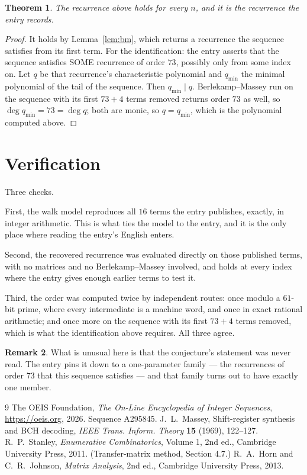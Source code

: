 \documentclass[11pt,a4paper]{article}
\theoremstyle{plain}
\newtheorem{theorem}{Theorem}
\theoremstyle{definition}
\newtheorem{remark}[theorem]{Remark}
\begin{document}
\begin{theorem}
The recurrence above holds for every $n$, and it is the recurrence the entry records.
\end{theorem}

\begin{proof}
It holds by Lemma~\ref{lem:bm}, which returns a recurrence the sequence satisfies from its
first term. For the identification: the entry asserts that the sequence satisfies SOME
recurrence of order $73$, possibly only from some index on. Let $q$ be that recurrence's
characteristic polynomial and $q_{\min}$ the minimal polynomial of the tail of the sequence.
Then $q_{\min}\mid q$. Berlekamp--Massey run on the sequence with its first $73+4$ terms
removed returns order $73$ as well, so $\deg q_{\min}=73=\deg q$; both are monic, so
$q=q_{\min}$, which is the polynomial computed above.
\end{proof}

\section{Verification}

Three checks.

First, the walk model reproduces all $16$ terms the entry publishes, exactly, in integer
arithmetic. This is what ties the model to the entry, and it is the only place where reading
the entry's English enters.

Second, the recovered recurrence was evaluated directly on those published terms, with no
matrices and no Berlekamp--Massey involved, and holds at every index where the entry gives
enough earlier terms to test it.

Third, the order was computed twice by independent routes: once modulo a $61$-bit prime, where
every intermediate is a machine word, and once in exact rational arithmetic; and once more on
the sequence with its first $73+4$ terms removed, which is what the identification above
requires. All three agree.

\begin{remark}
What is unusual here is that the conjecture's statement was never read. The entry pins it down
to a one-parameter family --- the recurrences of order $73$ that this sequence satisfies
--- and that family turns out to have exactly one member.
\end{remark}

\begin{thebibliography}{9}
 The OEIS Foundation, \emph{The On-Line Encyclopedia of Integer
Sequences}, \url{https://oeis.org}, 2026. Sequence A295845.
 J.~L.~Massey, Shift-register synthesis and BCH decoding, \emph{IEEE
Trans. Inform. Theory} \textbf{15} (1969), 122--127.
 R.~P.~Stanley, \emph{Enumerative Combinatorics}, Volume 1, 2nd ed.,
Cambridge University Press, 2011. (Transfer-matrix method, Section 4.7.)
 R.~A.~Horn and C.~R.~Johnson, \emph{Matrix Analysis}, 2nd ed., Cambridge
University Press, 2013.
\end{thebibliography}
\end{document}
